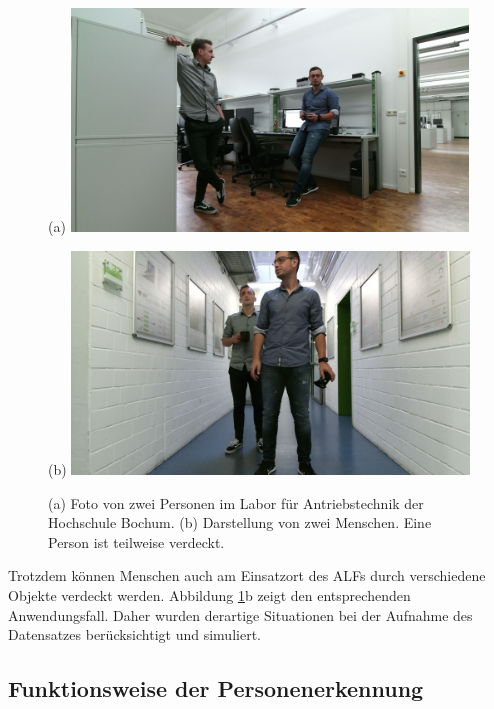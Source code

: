 			\begin{figure}[H]
			\centering
			\begin{minipage}[b]{0.49\textwidth}
				(a)
				\includegraphics[width=0.94\textwidth]{Bilder/26.jpg}
			\end{minipage}
			\hfill
			\begin{minipage}[b]{0.49\textwidth}
				(b)
				\includegraphics[width=0.94\textwidth]{Bilder/39.jpg}
			\end{minipage}
			\caption{(a) Foto von zwei Personen im Labor für Antriebstechnik der Hochschule Bochum. (b) Darstellung von zwei Menschen. Eine Person ist teilweise verdeckt. }
			\label{fig: owndata}
		\end{figure}
		
		Trotzdem können Menschen auch am Einsatzort des ALFs durch verschiedene Objekte verdeckt werden. Abbildung \ref{fig: owndata}b zeigt den entsprechenden Anwendungsfall. Daher wurden derartige Situationen bei der Aufnahme des Datensatzes berücksichtigt und simuliert.
		
	
		
	\subsection{Funktionsweise der Personenerkennung}
	\label{sec: Funktionsweise des Gesamtsystems}
	
